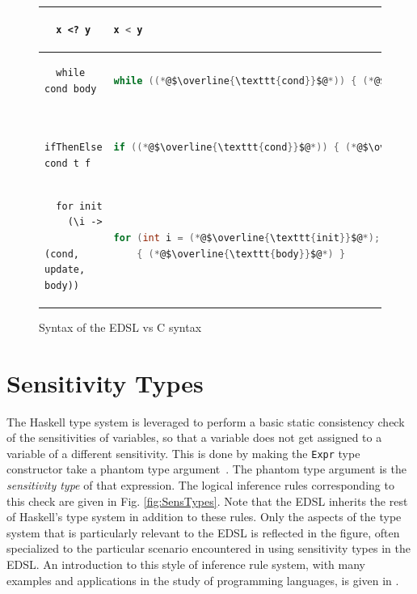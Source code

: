 \documentclass[10pt, conference]{IEEEtran}
\newcommand{\ttt}{\texttt}
\begin{document}
\begin{figure}
\begin{tabular}{|l|l|}
  \hline
  \begin{lstlisting}
  x <? y
  \end{lstlisting}
  & \begin{lstlisting}[language=C]
  x < y
  \end{lstlisting}\\

  \hline
  \begin{lstlisting}
  while cond body
  \end{lstlisting}
  & \begin{lstlisting}[language=C]
  while ((*@$\overline{\ttt{cond}}$@*)) { (*@$\overline{\ttt{body}}$@*) }
  \end{lstlisting}\\

  \hline
  \begin{lstlisting}
  ifThenElse cond t f
  \end{lstlisting}
  & \begin{lstlisting}[language=C]
  if ((*@$\overline{\ttt{cond}}$@*)) { (*@$\overline{\ttt{t}}$@*) } else { (*@$\overline{\ttt{f}}$@*) }
  \end{lstlisting}\\

  \hline
  \begin{lstlisting}
  for init
    (\i ->
      (cond, update, body))
  \end{lstlisting}
  & \begin{lstlisting}[language=C]
  for (int i = (*@$\overline{\ttt{init}}$@*); (*@$\overline{\ttt{cond}}$@*); (*@$\overline{\ttt{update}}$@*))
    { (*@$\overline{\ttt{body}}$@*) }
  \end{lstlisting}\\


  \hline
\end{tabular}
\caption{Syntax of the EDSL vs C syntax}
\label{fig:Syntax}
\end{figure}

\section{Sensitivity Types}
The Haskell type system is leveraged to perform a basic static consistency check
of the sensitivities of variables, so that a variable does not get assigned to a
variable of a different sensitivity. This is done by making the \verb|Expr| type
constructor take a phantom type argument~\cite{Phantom}. The phantom type
argument is the \textit{sensitivity type} of that expression.  The logical
inference rules corresponding to this check are given in Fig.
\ref{fig:SensTypes}. Note that the EDSL inherits the rest of Haskell's type
system in addition to these rules. Only the aspects of the type system that is
particularly relevant to the EDSL is reflected in the figure, often specialized
to the particular scenario encountered in using sensitivity types in the EDSL.
An introduction to this style of inference rule system, with many examples and
applications in the study of programming languages, is given in
\cite{HarperFoundations}.
\end{document}
